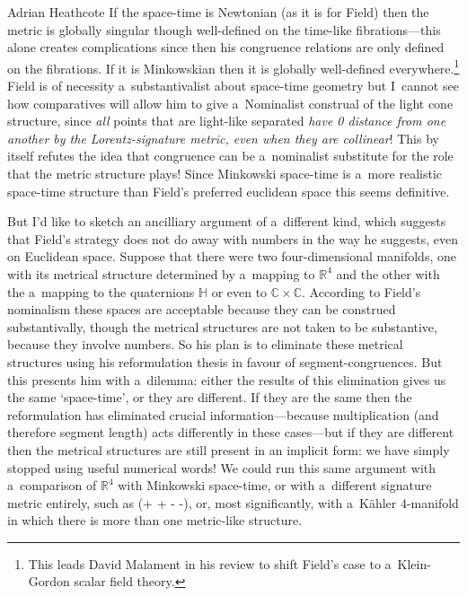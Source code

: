\begin{artengenv}{Adrian Heathcote}
If the space-time is Newtonian (as it is for Field) then the metric is globally singular though well-defined on the time-like fibrations---this alone creates complications since then his congruence relations are only defined on the fibrations. If it is Minkowskian then it is globally well-defined everywhere.\footnote{This leads David Malament in his review \parencite*{malament_science_1982} to shift Field's case to a~Klein-Gordon scalar field theory.} Field is of necessity a~substantivalist about space-time geometry but I~cannot see how comparatives will allow him to give a~Nominalist construal of the light cone structure, since \textit{all} points that are light-like separated \emph{have 0 distance from one another by the Lorentz-signature metric, even when they are collinear}!  This by itself refutes the idea that congruence can be a~nominalist substitute for the role that the metric structure plays! Since Minkowski space-time is a~more realistic space-time structure than Field's preferred euclidean space this seems definitive.

But I'd like to sketch an ancilliary argument of a~different kind, which suggests that Field's strategy does not do away with numbers in the way he suggests, even on Euclidean space. Suppose that there were two four-dimensional manifolds, one with its metrical structure determined by a~mapping to $\mathbb{R}^{4}$ and the other with the a~mapping to the quaternions $\mathbb{H}$ or even to $\mathbb{C} \times \mathbb{C}$. According to Field's nominalism these spaces are acceptable because they can be construed substantivally, though the metrical structures are not taken to be substantive, because they involve numbers. So his plan is to eliminate these metrical structures using his reformulation thesis in favour of segment-congruences. But this presents him with a~dilemma: either the results of this elimination gives us the same `space-time', or they are different. If they are the same then the reformulation has eliminated crucial information---because multiplication (and therefore segment length) acts differently in these cases---but if they are different then the metrical structures are still present in an implicit form: we have simply stopped using useful numerical words! We could run this same argument with a~comparison of $\mathbb{R}^{4}$ with Minkowski space-time, or with a~different signature metric entirely, such as (+ + - -), or, most significantly, with a~Kähler 4-manifold in which there is more than one metric-like structure. 


\end{artengenv}
